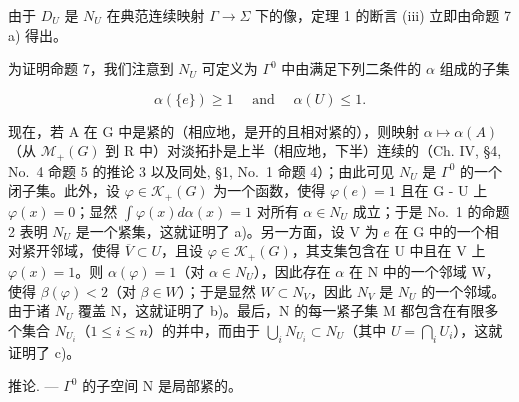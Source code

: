 由于 \(D_{U}\) 是 \(N_{U}\) 在典范连续映射 \(\Gamma \rightarrow \Sigma\) 下的像，定理 1 的断言 (iii) 立即由命题 7 a) 得出。

为证明命题 7，我们注意到 \(N_{U}\) 可定义为 \(\Gamma^{0}\) 中由满足下列二条件的 \(\alpha\) 组成的子集

\[
\alpha (\{e \}) \geqslant 1 \quad \text { and } \quad \alpha (U) \leqslant 1.
\]

现在，若 A 在 G 中是紧的（相应地，是开的且相对紧的），则映射 \(\alpha \mapsto \alpha(A)\)（从 \(\mathcal{M}_{+}(G)\) 到 R 中）对淡拓扑是上半（相应地，下半）连续的（Ch. IV, §4, No.~4 命题 5 的推论 3 以及同处, §1, No.~1 命题 4）；由此可见 \(N_{U}\) 是 \(\Gamma^{0}\) 的一个闭子集。此外，设 \(\varphi \in \mathcal{K}_{+}(G)\) 为一个函数，使得 \(\varphi(e) = 1\) 且在 G - U 上 \(\varphi(x) = 0\)；显然 \(\int \varphi(x)d\alpha(x) = 1\) 对所有 \(\alpha \in N_{U}\) 成立；于是 No.~1 的命题 2 表明 \(N_{U}\) 是一个紧集，这就证明了 a)。另一方面，设 V 为 \(e\) 在 G 中的一个相对紧开邻域，使得 \(\overline{V} \subset U\)，且设 \(\varphi \in \mathcal{K}_{+}(G)\)，其支集包含在 U 中且在 V 上 \(\varphi(x) = 1\)。则 \(\alpha(\varphi) = 1\)（对 \(\alpha \in N_{U}\)），因此存在 \(\alpha\) 在 N 中的一个邻域 W，使得 \(\beta(\varphi) < 2\)（对 \(\beta \in W\)）；于是显然 \(W \subset N_{V}\)，因此 \(N_{V}\) 是 \(N_{U}\) 的一个邻域。由于诸 \(N_{U}\) 覆盖 N，这就证明了 b)。最后，N 的每一紧子集 M 都包含在有限多个集合 \(N_{U_i}\)（\(1 \leqslant i \leqslant n\)）的并中，而由于 \(\bigcup_{i} N_{U_i} \subset N_{U}\)（其中 \(U = \bigcap_{i} U_i\)），这就证明了 c)。

推论. --- \(\Gamma^0\) 的子空间 N 是局部紧的。
\relax{}
